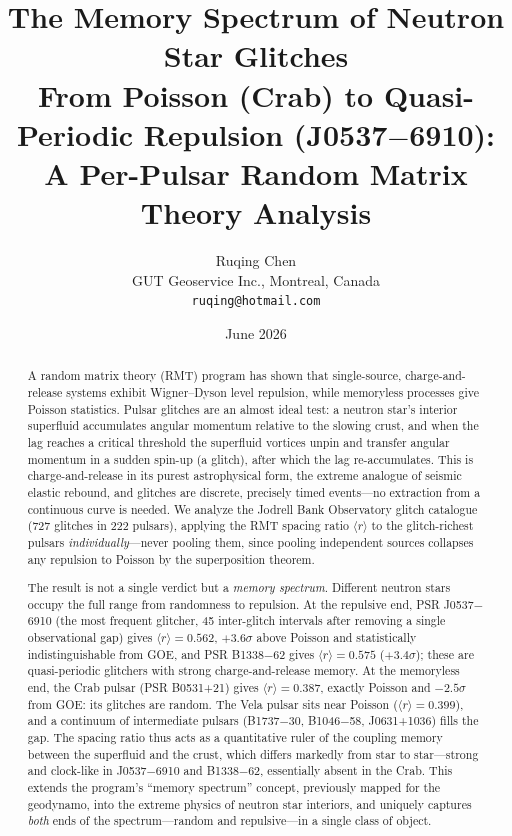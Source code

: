 \documentclass[12pt,a4paper]{article}
\title{\textbf{The Memory Spectrum of Neutron Star Glitches}\\[0.4em]
\large From Poisson (Crab) to Quasi-Periodic Repulsion (J0537$-$6910): A Per-Pulsar Random Matrix Theory Analysis}
\author{Ruqing Chen\\ GUT Geoservice Inc., Montreal, Canada\\ \texttt{ruqing@hotmail.com}}
\date{June 2026}
\begin{document}
\maketitle

\begin{abstract}
\noindent A random matrix theory (RMT) program has shown that single-source, charge-and-release systems exhibit Wigner--Dyson level repulsion, while memoryless processes give Poisson statistics. Pulsar glitches are an almost ideal test: a neutron star's interior superfluid accumulates angular momentum relative to the slowing crust, and when the lag reaches a critical threshold the superfluid vortices unpin and transfer angular momentum in a sudden spin-up (a glitch), after which the lag re-accumulates. This is charge-and-release in its purest astrophysical form, the extreme analogue of seismic elastic rebound, and glitches are discrete, precisely timed events---no extraction from a continuous curve is needed. We analyze the Jodrell Bank Observatory glitch catalogue (727 glitches in 222 pulsars), applying the RMT spacing ratio $\langle r\rangle$ to the glitch-richest pulsars \emph{individually}---never pooling them, since pooling independent sources collapses any repulsion to Poisson by the superposition theorem.

The result is not a single verdict but a \emph{memory spectrum}. Different neutron stars occupy the full range from randomness to repulsion. At the repulsive end, PSR J0537$-$6910 (the most frequent glitcher, 45 inter-glitch intervals after removing a single observational gap) gives $\langle r\rangle=0.562$, $+3.6\sigma$ above Poisson and statistically indistinguishable from GOE, and PSR B1338$-$62 gives $\langle r\rangle=0.575$ ($+3.4\sigma$); these are quasi-periodic glitchers with strong charge-and-release memory. At the memoryless end, the Crab pulsar (PSR B0531+21) gives $\langle r\rangle=0.387$, exactly Poisson and $-2.5\sigma$ from GOE: its glitches are random. The Vela pulsar sits near Poisson ($\langle r\rangle=0.399$), and a continuum of intermediate pulsars (B1737$-$30, B1046$-$58, J0631+1036) fills the gap. The spacing ratio thus acts as a quantitative ruler of the coupling memory between the superfluid and the crust, which differs markedly from star to star---strong and clock-like in J0537$-$6910 and B1338$-$62, essentially absent in the Crab. This extends the program's ``memory spectrum'' concept, previously mapped for the geodynamo, into the extreme physics of neutron star interiors, and uniquely captures \emph{both} ends of the spectrum---random and repulsive---in a single class of object.


\end{abstract}
\end{document}
